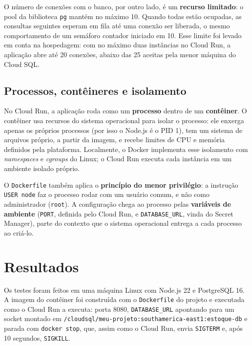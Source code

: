 \documentclass[12pt,a4paper]{article}
\newcommand{\arq}[1]{\texttt{#1}}
\begin{document}
O número de conexões com o banco, por outro lado, é um \textbf{recurso limitado}: o pool da
biblioteca \texttt{pg} mantém no máximo 10. Quando todas estão ocupadas, as consultas seguintes
esperam em fila até uma conexão ser liberada, o mesmo comportamento de um semáforo contador
iniciado em 10. Esse limite foi levado em conta na hospedagem: com no máximo duas instâncias no
Cloud Run, a aplicação abre até 20 conexões, abaixo das 25 aceitas pela menor máquina do Cloud
SQL.

\subsection{Processos, contêineres e isolamento}

No Cloud Run, a aplicação roda como um \textbf{processo} dentro de um \textbf{contêiner}. O
contêiner usa recursos do sistema operacional para isolar o processo: ele enxerga apenas os
próprios processos (por isso o Node.js é o PID 1), tem um sistema de arquivos próprio, a
partir da imagem, e recebe limites de CPU e memória definidos pela plataforma. Localmente, o
Docker implementa esse isolamento com \emph{namespaces} e \emph{cgroups} do Linux; o Cloud Run
executa cada instância em um ambiente isolado próprio.

O \arq{Dockerfile} também aplica o \textbf{princípio do menor privilégio}: a instrução
\texttt{USER node} faz o processo rodar com um usuário comum, e não como administrador
(\texttt{root}). A configuração chega ao processo pelas \textbf{variáveis de ambiente}
(\texttt{PORT}, definida pelo Cloud Run, e \texttt{DATABASE\_URL}, vinda do Secret Manager),
parte do contexto que o sistema operacional entrega a cada processo ao criá-lo.

\section{Resultados}
\label{sec:resultados}

Os testes foram feitos em uma máquina Linux com Node.js 22 e PostgreSQL 16. A imagem do
contêiner foi construída com o \arq{Dockerfile} do projeto e executada como o Cloud Run a
executa: porta 8080, \texttt{DATABASE\_URL} apontando para um socket montado em
\texttt{/cloudsql/meu-projeto:southamerica-east1:estoque-db} e parada com \texttt{docker stop},
que, assim como o Cloud Run, envia \texttt{SIGTERM} e, após 10 segundos, \texttt{SIGKILL}.
\end{document}
